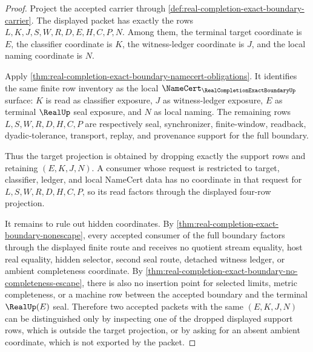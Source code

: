 \begin{proof}
Project the accepted carrier through \autoref{def:real-completion-exact-boundary-carrier}. The displayed packet has exactly the rows $L,K,J,S,W,R,D,E,H,C,P,N$. Among them, the terminal target coordinate is $E$, the classifier coordinate is $K$, the witness-ledger coordinate is $J$, and the local naming coordinate is $N$.

Apply \autoref{thm:real-completion-exact-boundary-namecert-obligations}. It identifies the same finite row inventory as the local $\NameCert_{\RealCompletionExactBoundaryUp}$ surface: $K$ is read as classifier exposure, $J$ as witness-ledger exposure, $E$ as terminal $\RealUp$ seal exposure, and $N$ as local naming. The remaining rows $L,S,W,R,D,H,C,P$ are respectively seal, synchronizer, finite-window, readback, dyadic-tolerance, transport, replay, and provenance support for the full boundary.

Thus the target projection is obtained by dropping exactly the support rows and retaining $(E,K,J,N)$. A consumer whose request is restricted to target, classifier, ledger, and local NameCert data has no coordinate in that request for $L,S,W,R,D,H,C,P$, so its read factors through the displayed four-row projection.

It remains to rule out hidden coordinates. By \autoref{thm:real-completion-exact-boundary-nonescape}, every accepted consumer of the full boundary factors through the displayed finite route and receives no quotient stream equality, host real equality, hidden selector, second seal route, detached witness ledger, or ambient completeness coordinate. By \autoref{thm:real-completion-exact-boundary-no-completeness-escape}, there is also no insertion point for selected limits, metric completeness, or a machine row between the accepted boundary and the terminal $\RealUp(E)$ seal. Therefore two accepted packets with the same $(E,K,J,N)$ can be distinguished only by inspecting one of the dropped displayed support rows, which is outside the target projection, or by asking for an absent ambient coordinate, which is not exported by the packet.
\end{proof}

